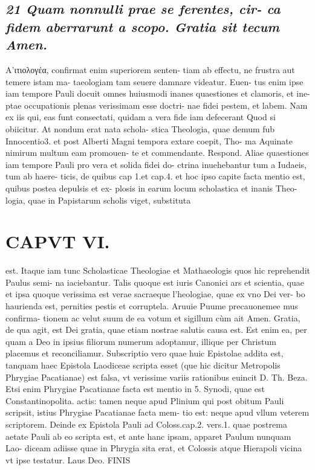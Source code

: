 \documentclass{article}
\begin{document}
\begin{pages}
\subsection*{\textit{21 Quam nonnulli prae se ferentes, cir- ca fidem aberrarunt a scopo. Gratia sit tecum Amen. }}\pstart Α'ιτιολογέα, confirmat enim superiorem senten- tiam ab effectu, ne frustra aut temere istam ma- taeologiam tam seuere damnare videatur. Euen- tus enim ipse iam tempore Pauli docuit omnes huiusmodi inanes quaestiones et clamoris, et ine- ptae occupationis plenas verissimam esse doctri- nae fidei pestem, et labem. Nam ex iis qui, eas funt consectati, quidam a vera fide iam defecerant Quod si obiicitur. At nondum erat nata schola- stica Theologia, quae demum fub Innocentio3. et post Alberti Magni tempora extare coepit, Tho- ma Aquinate nimirum multum eam promouen- te et commendante. Respond. Aliae quaestiones iam tempore Pauli pro vera et solida fidei do- ctrina inuehebantur tum a Iudaeis, tum ab haere- ticis, de quibus cap 1.et cap.4. et hoc ipso capite facta mentio est, quibus postea depulsis et ex- plosis in earum locum scholastica et inanis Theo- logia, quae in Papistarum scholis viget, substituta  \pend
\section*{CAPVT VI. }
\marginpar{[ p.513 ]}\pstart est. Itaque iam tunc Scholasticae Theologiae et Mathaeologis quos hic reprehendit Paulus semi- na iaciebantur. Talis quoque est iuris Canonici ars et scientia, quae et ipsa quoque verissima est verae sacraeque l’heologiae, quae ex vno Dei ver- bo haurienda est, pernities pestis et corruptela.  \pend\pstart Aruuie Puume precauonemee mus confirma- tionem ac velut suum de ea votum et sigillum cùm ait Amen.  \pend\pstart Gratia, de qua agit, est Dei gratia, quae etiam nostrae salutis causa est. Est enim ea, per quam a Deo in ipsius filiorum numerum adoptamur, illique per Christum placemus et reconciliamur. Subscriptio vero quae huic Epistolae addita est, tanquam haec Epistola Laodiceae scripta esset (que hic dicitur Metropolis Phrygiae Pacatianae) est falsa, vt verissime variis rationibus euincit D. Th. Beza. Etsi enim Phrygiae Pacatianae facta est mentio in 5. Synodi, quae est Constantinopolita. actis: tamen neque apud Plinium qui post obitum Pauli scripsit, istius Phrygiae Pacatianae facta mem- tio est: neque apud vllum veterem scriptorem. Deinde ex Epistola Pauli ad Coloss.cap.2. vers.1. quae postrema aetate Pauli ab eo scripta est, et ante hanc ipsam, apparet Paulum nunquam Lao- diceam adiisse quae in Phrygia sita erat, et Colossis atque  Hierapoli vicina vt ipse testatur. Laus Deo. FINIS  \pend
\endnumbering
\end{pages}
\end{document}
